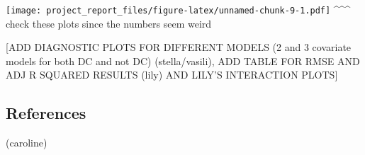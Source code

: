 \documentclass[
]{article}
\begin{document}
\texttt{[image: project\_report\_files/figure-latex/unnamed-chunk-9-1.pdf]}
\^{}\^{}\^{} check these plots since the numbers seem weird

{[}ADD DIAGNOSTIC PLOTS FOR DIFFERENT MODELS (2 and 3 covariate models
for both DC and not DC) (stella/vasili), ADD TABLE FOR RMSE AND ADJ R
SQUARED RESULTS (lily) AND LILY'S INTERACTION PLOTS{]}

\hypertarget{references}{%
\subsection{References}\label{references}}

(caroline)
\end{document}
